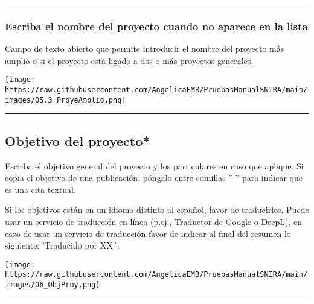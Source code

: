 \documentclass[
]{book}
\begin{document}
\begin{center}\rule{0.5\linewidth}{0.5pt}\end{center}

\hypertarget{escriba-el-nombre-del-proyecto-cuando-no-aparece-en-la-lista}{%
\subsubsection*{Escriba el nombre del proyecto cuando no aparece en la lista}\label{escriba-el-nombre-del-proyecto-cuando-no-aparece-en-la-lista}}

Campo de texto abierto que permite introducir el nombre del proyecto más amplio o si el proyecto está ligado a dos o más proyectos generales.

\texttt{[image: https://raw.githubusercontent.com/AngelicaEMB/PruebasManualSNIRA/main/images/05.3\_ProyeAmplio.png]}

\begin{center}\rule{0.5\linewidth}{0.5pt}\end{center}

\hypertarget{objetivo-del-proyecto}{%
\subsection*{\texorpdfstring{{Objetivo del proyecto*}}{Objetivo del proyecto*}}\label{objetivo-del-proyecto}}

Escriba el objetivo general del proyecto y los particulares en caso que aplique. Si copia el objetivo de una publicación, póngalo entre comillas '' '' para indicar que es una cita textual.

Si los objetivos están en un idioma distinto al español, favor de traducirlos. Puede usar un servicio de traducción en línea (p.ej., Traductor de \href{https://translate.google.com.mx/?hl=es}{Google} o \href{https://www.deepl.com/es/translator}{DeepL}), en caso de usar un servicio de traducción favor de indicar al final del resumen lo siguiente: 'Traducido por XX´.

\texttt{[image: https://raw.githubusercontent.com/AngelicaEMB/PruebasManualSNIRA/main/images/06\_ObjProy.png]}

\begin{center}\rule{0.5\linewidth}{0.5pt}\end{center}
\end{document}
